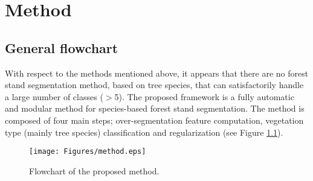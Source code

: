 
\chapter{Method} %
\label{Chapter2} %

\startcontents[chapters]
\Mprintcontents





\section{General flowchart}

With respect to the methods mentioned above, it appears that there are no forest stand segmentation method, based on tree species, that can satisfactorily handle a large number of classes ($>$5). The proposed framework is a fully automatic and modular method for species-based forest stand segmentation. The method is composed of four main steps; over-segmentation feature computation, vegetation type (mainly tree species) classification and regularization (see Figure \ref{fig:flowchart}).

\begin{figure}[htbp]
\begin{center}
\texttt{[image: Figures/method.eps]}
\caption{Flowchart of the proposed method.}
\label{fig:flowchart}
\end{center}
\end{figure}

